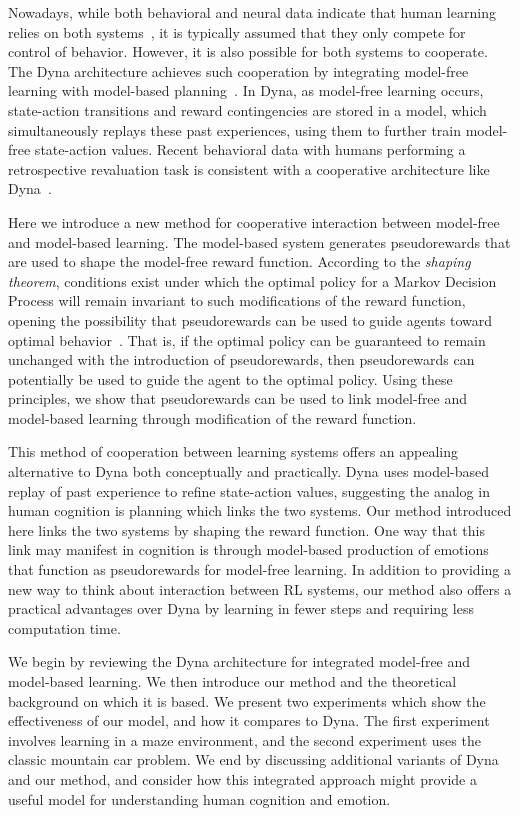 \documentclass[letterpaper]{article}
\begin{document}
Nowadays, while both behavioral and neural data indicate that human learning relies on both systems~\cite{daw2005uncertainty, glascher2010states, dayan2014model}, it is typically assumed that they only compete for control of behavior. However, it is also possible for both systems to cooperate. The Dyna architecture achieves such cooperation by integrating model-free learning with model-based planning~\cite{sutton1991dyna}. In Dyna, as model-free learning occurs, state-action transitions and reward contingencies are stored in a model, which simultaneously replays these past experiences, using them to further train model-free state-action values. Recent behavioral data with humans performing a retrospective revaluation task is consistent with a cooperative architecture like Dyna~\cite{gershman2014retrospective}.

Here we introduce a new method for cooperative interaction between model-free and model-based learning. The model-based system generates pseudorewards that are used to shape the model-free reward function. According to the \textit{shaping theorem}, conditions exist under which the optimal policy for a Markov Decision Process will remain invariant to such modifications of the reward function, opening the possibility that pseudorewards can be used to guide agents toward optimal behavior~\cite{ng1999policy}. That is, if the optimal policy can be guaranteed to remain unchanged with the introduction of pseudorewards, then pseudorewards can potentially be used to guide the agent to the optimal policy. Using these principles, we show that pseudorewards can be used to link model-free and model-based learning through modification of the reward function.

This method of cooperation between learning systems offers an appealing alternative to Dyna both conceptually and practically. Dyna uses model-based replay of past experience to refine state-action values, suggesting the analog in human cognition is planning which links the two systems. Our method introduced here links the two systems by shaping the reward function. One way that this link may manifest in cognition is through model-based production of emotions that function as pseudorewards for model-free learning. In addition to providing a new way to think about interaction between RL systems, our method also offers a practical advantages over Dyna by learning in fewer steps and requiring less computation time.

We begin by reviewing the Dyna architecture for integrated model-free and model-based learning. We then introduce our method and the theoretical background on which it is based. We present two experiments which show the effectiveness of our model, and how it compares to Dyna. The first experiment involves learning in a maze environment, and the second experiment uses the classic mountain car problem. We end by discussing additional variants of Dyna and our method, and consider how this integrated approach might provide a useful model for understanding human cognition and emotion.
\end{document}
